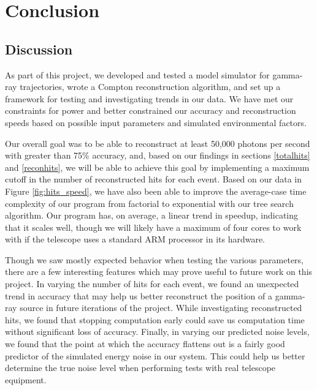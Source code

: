 \chapter{Conclusion}

\section{Discussion}
As part of this project, we developed and tested a model simulator for gamma-ray trajectories, wrote a Compton reconstruction algorithm, and set up a framework for testing and investigating trends in our data. We have met our constraints for power and better constrained our accuracy and reconstruction speeds based on possible input parameters and simulated environmental factors.

Our overall goal was to be able to reconstruct at least 50,000 photons per second with greater than 75\% accuracy, and, based on our findings in sections \ref{totalhits} and \ref{reconhits}, we will be able to achieve this goal by implementing a maximum cutoff in the number of reconstructed hits for each event. Based on our data in Figure \ref{fig:hits_speed}, we have also been able to improve the average-case time complexity of our program from factorial to exponential with our tree search algorithm. Our program has, on average, a linear trend in speedup, indicating that it scales well, though we will likely have a maximum of four cores to work with if the telescope uses a standard ARM processor in its hardware.

Though we saw mostly expected behavior when testing the various parameters, there are a few interesting features which may prove useful to future work on this project. In varying the number of hits for each event, we found an unexpected trend in accuracy that may help us better reconstruct the position of a gamma-ray source in future iterations of the project. While investigating reconstructed hits, we found that stopping computation early could save us computation time without significant loss of accuracy. Finally, in varying our predicted noise levels, we found that the point at which the accuracy flattens out is a fairly good predictor of the simulated energy noise in our system. This could help us better determine the true noise level when performing tests with real telescope equipment.

